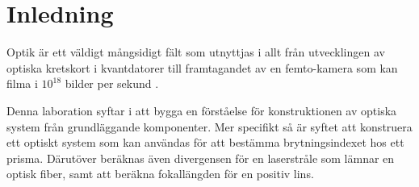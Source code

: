 \documentclass[a4paper]{article}
\begin{document}
\vspace{3mm}

\section{Inledning}

%



Optik är ett väldigt mångsidigt fält som utnyttjas i allt från utvecklingen av optiska kretskort i kvantdatorer \cite{quantumOptics} till framtagandet av en femto-kamera som kan filma i $10^{18}$ bilder per sekund \cite{femtoKamera}.

Denna laboration syftar i att bygga en förståelse för konstruktionen av optiska system från grundläggande komponenter. Mer specifikt så är syftet att konstruera ett optiskt system som kan användas för att bestämma brytningsindexet hos ett prisma. Därutöver beräknas även divergensen för en laserstråle som lämnar en optisk fiber, samt att beräkna fokallängden för en positiv lins.
\end{document}
